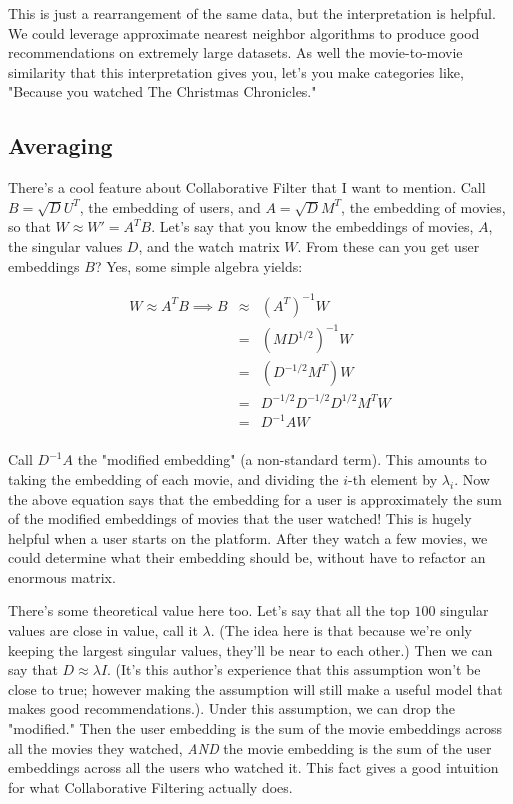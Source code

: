 \documentclass{amsbook}
\begin{document}
This is just a rearrangement of the same data, but the interpretation is helpful.  We could leverage approximate nearest neighbor algorithms to produce good recommendations on extremely large datasets.  As well the movie-to-movie similarity that this interpretation gives you, let's you make categories like, "Because you watched The Christmas Chronicles."

\subsection{Averaging}

There's a cool feature about Collaborative Filter that I want to mention.  Call $B=\sqrt DU^T$, the embedding of users, and $A=\sqrt DM^T$, the embedding of movies, so that $W\approx W'=A^TB$.  Let's say that you know the embeddings of movies, $A$, the singular values $D$, and the watch matrix $W$.  From these can you get user embeddings $B$?  Yes, some simple algebra yields:

$$
\begin{array}{rcl}
W\approx A^TB \implies B & \approx & \left(A^T\right)^{-1}W \\
 & = & \left(MD^{1/2}\right)^{-1}W \\
 & = & \left(D^{-1/2}M^T\right)W \\
 & = & D^{-1/2}D^{-1/2}D^{1/2}M^TW \\
 & = & D^{-1}AW \\
\end{array}
$$

Call $D^{-1}A$ the "modified embedding" (a non-standard term).  This amounts to taking the embedding of each movie, and dividing the $i$-th element by $\lambda_i$.  Now the above equation says that the embedding for a user is approximately the sum of the modified embeddings of movies that the user watched!  This is hugely helpful when a user starts on the platform.  After they watch a few movies, we could determine what their embedding should be, without have to refactor an enormous matrix.

There's some theoretical value here too.  Let's say that all the top $100$ singular values are close in value, call it $\lambda$.  (The idea here is that because we're only keeping the largest singular values, they'll be near to each other.)  Then we can say that $D\approx\lambda I$.  (It's this author's experience that this assumption won't be close to true; however making the assumption will still make a useful model that makes good recommendations.). Under this assumption, we can drop the "modified."  Then the user embedding is the sum of the movie embeddings across all the movies they watched, {\em AND} the movie embedding is the sum of the user embeddings across all the users who watched it.  This fact gives a good intuition for what Collaborative Filtering actually does.
\end{document}
